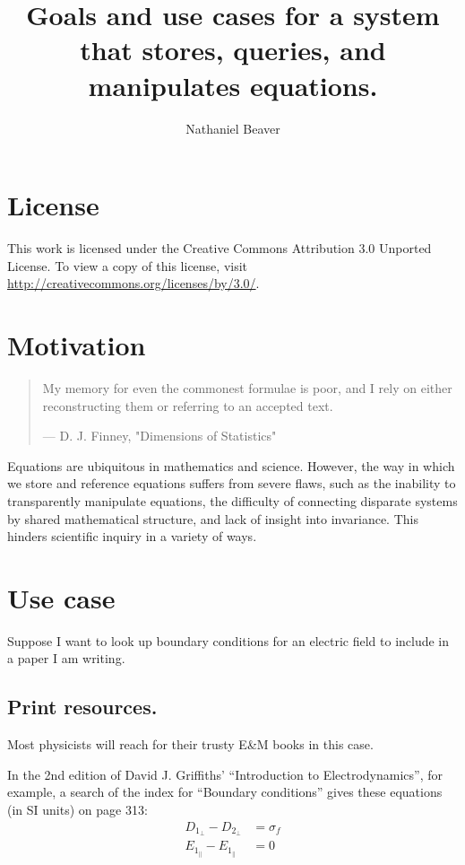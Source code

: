 \documentclass[12pt,letterpaper]{article}
\author{Nathaniel Beaver}
\title{Goals and use cases for a system that stores, queries, and manipulates equations.}
\begin{document}
\maketitle

\tableofcontents

\section{License}

This work is licensed under the Creative Commons Attribution 3.0 Unported License.
To view a copy of this license, visit \url{http://creativecommons.org/licenses/by/3.0/}.

\section{Motivation}

\begin{quote}
My memory for even the commonest
formulae is poor, and I rely on either reconstructing them or referring to an accepted text.

--- D. J. Finney, "Dimensions of Statistics"
\end{quote}

Equations are ubiquitous in mathematics and science.
However, the way in which we store and reference equations suffers from severe flaws,
such as the inability to transparently manipulate equations,
the difficulty of connecting disparate systems by shared mathematical structure,
and lack of insight into invariance.
This hinders scientific inquiry in a variety of ways.

\section{Use case}

Suppose I want to look up boundary conditions for an electric field to include in a paper I am writing.

\subsection{Print resources.}

Most physicists will reach for their trusty E\&M books in this case.

In the 2nd edition of David J. Griffiths' ``Introduction to Electrodynamics'', for example,
a search of the index for ``Boundary conditions'' gives these equations (in SI units) on page 313:
\begin{align*}
D_{1_\bot} - D_{2_\bot} &= \sigma_f \\
E_{1_\parallel} - E_{1_\parallel} &= 0
\end{align*}
\end{document}
